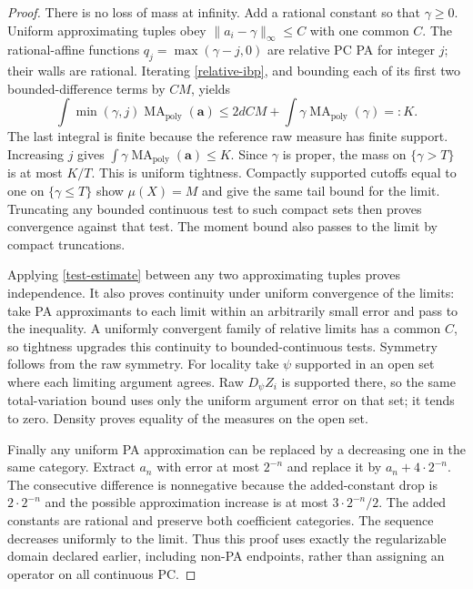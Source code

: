\documentclass[11pt]{article}
\newcommand{\MA}{\operatorname{MA}_{\mathrm{poly}}}
\begin{document}
\begin{proof}
There is no loss of mass at infinity. Add a rational constant so that
$\gamma\geq0$. Uniform approximating tuples obey
$\|a_i-\gamma\|_\infty\leq C$ with one common $C$.
The rational-affine functions $q_j=\max(\gamma-j,0)$ are relative PC PA
for integer $j$; their walls are rational. Iterating
\eqref{relative-ibp}, and bounding each of its first two bounded-difference
terms by $CM$, yields
\begin{equation}\label{moment}
 \int\min(\gamma,j)\MA(\mathbf a)
 \leq 2dCM+\int\gamma\MA(\gamma)=:K.
\end{equation}
The last integral is finite because the reference raw measure has finite
support. Increasing $j$ gives $\int\gamma\MA(\mathbf a)\leq K$.
Since $\gamma$ is proper, the mass on $\{\gamma>T\}$ is at most $K/T$.
This is uniform tightness. Compactly supported cutoffs equal to one on
$\{\gamma\leq T\}$ show $\mu(X)=M$ and give the same tail bound for
the limit. Truncating any bounded continuous test to such compact sets
then proves convergence against that test. The moment bound also passes
to the limit by compact truncations.

Applying \eqref{test-estimate} between any two approximating tuples
proves independence. It also proves continuity under uniform convergence
of the limits: take PA approximants to each limit within an arbitrarily
small error and pass to the inequality. A uniformly convergent family
of relative limits has a common $C$, so tightness upgrades this
continuity to bounded-continuous tests. Symmetry follows from the raw
symmetry. For locality take $\psi$ supported in an open set where
each limiting argument agrees. Raw $D_\psi Z_i$ is supported there,
so the same total-variation bound uses only the uniform argument error
on that set; it tends to zero. Density proves equality of the measures
on the open set.

Finally any uniform PA approximation can be replaced by a decreasing
one in the same category. Extract $a_n$ with error at most $2^{-n}$
and replace it by $a_n+4\cdot2^{-n}$. The consecutive difference is
nonnegative because the added-constant drop is $2\cdot2^{-n}$ and the
possible approximation increase is at most $3\cdot2^{-n}/2$.
The added constants are rational and preserve both coefficient categories.
The sequence decreases uniformly to the limit. Thus this proof uses
exactly the regularizable domain declared earlier, including non-PA
endpoints, rather than assigning an operator on all continuous PC.
\end{proof}
\end{document}
